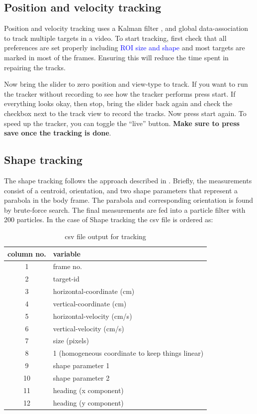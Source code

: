 \documentclass[12pt]{article}
\begin{document}
\subsection{Position and velocity tracking}
Position and velocity tracking uses a Kalman filter \cite{BarShalom1987}, and global data-association \cite{Kuhn1955} to track multiple targets in a video. To start tracking, first check that all preferences are set properly including \textcolor{blue}{ROI size and shape} and most targets are marked in most of the frames. Ensuring this will reduce the time spent in repairing the tracks. 

Now bring the slider to zero position and view-type to track. If you want to run the tracker without recording to see how the tracker performs press start. If everything looks okay, then stop, bring the slider back again and check the checkbox next to the track view to record the tracks. Now press start again. To speed up the tracker, you can toggle the ``live'' button. \textbf{Make sure to press save once the tracking is done}.
\subsection{Shape tracking}
The shape tracking follows the approach described in \cite{Bartolini2014}. Briefly, the measurements consist of a centroid, orientation, and two shape parameters that represent a parabola in the body frame. The parabola and corresponding orientation is found by brute-force search. The final measurements are fed into a particle filter with 200 particles. 
In the case of Shape tracking the csv file is ordered as:
\begin{table}[t]
\caption{csv file output for  tracking}
\begin{center}
\begin{tabular}[t]{cl}
\hline
column no. &  variable \\
\hline
1 & frame  no. \\
2 & target-id \\
3 &  horizontal-coordinate (cm) \\
4 & vertical-coordinate (cm) \\
5 &  horizontal-velocity (cm/s) \\
6 &  vertical-velocity (cm/s) \\
7 &  size (pixels) \\
8& 1 (homogeneous coordinate to keep things linear) \\
9  &shape parameter 1\\
10 &  shape parameter 2\\
11 &  heading (x component) \\
12 &  heading (y component) \\
\end{tabular}
\end{center}
\label{tab:csvcolumns}
\end{table}
\end{document}
